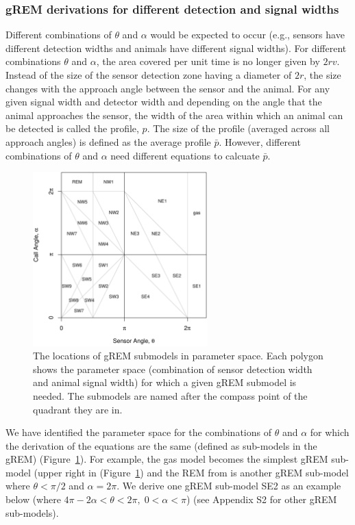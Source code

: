 \documentclass[a4paper,10pt,reqno,oneside]{amsart}
\begin{document}
\subsubsection{gREM derivations for different detection and signal widths}
Different combinations of $\theta$ and $\alpha$ would be expected to occur (e.g., sensors have different detection widths and animals have different signal widths). For different combinations $\theta$ and $\alpha$, the area covered per unit time is no longer given by $2rv$. Instead of the size of the sensor detection zone having a diameter of $2r$, the size changes with the approach angle between the sensor and the animal. For any given signal width and detector width and depending on the angle that the animal approaches the sensor, the width of the area within which an animal can be detected is called the profile, $p$. The size of the profile (averaged across all approach angles) is defined as the average profile $\bar{p}$. However, different combinations of $\theta$ and $\alpha$ need different equations to calcuate $\bar{p}$. 

\begin{figure}
\centering
\includegraphics[width=0.6\textwidth]{imgs/equalRegions.pdf}
\caption{The locations of gREM submodels in parameter space. Each polygon shows the parameter space (combination of sensor detection width and animal signal width) for which a given gREM submodel is needed. The submodels are named after the compass point of the quadrant they are in.}
\label{f:equalRegions}
\end{figure}

We have identified the parameter space for the combinations of $\theta$ and $\alpha$ for which the derivation of the equations are the same (defined as sub-models in the gREM) (Figure~\ref{f:equalRegions}). For example, the gas model becomes the simplest gREM sub-model (upper right in (Figure~\ref{f:equalRegions}) and the REM from \citep{rowcliffe2008estimating} is another gREM sub-model where $\theta<\pi/2$ and $\alpha = 2\pi$. We derive one gREM sub-model SE2 as an example below (where $4 \pi - 2 \alpha < \theta < 2\pi ,\; 0 < \alpha <\pi$) (see Appendix S2 for other gREM sub-models).
\end{document}
